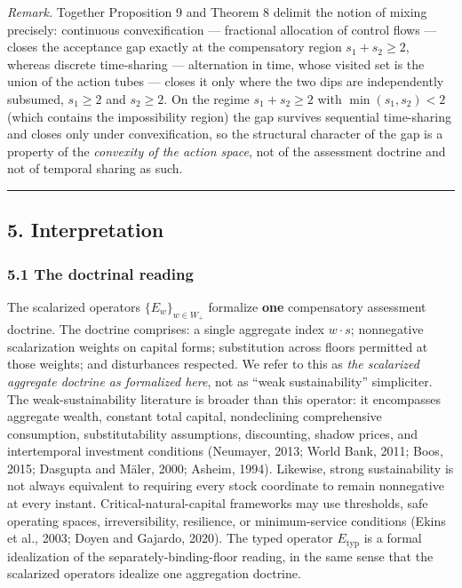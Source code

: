 \documentclass[11pt]{article}
\begin{document}
\emph{Remark.} Together Proposition 9 and Theorem 8 delimit the notion
of mixing precisely: continuous convexification --- fractional
allocation of control flows --- closes the acceptance gap exactly at the
compensatory region \(s_1 + s_2 \ge 2\), whereas discrete time-sharing
--- alternation in time, whose visited set is the union of the action
tubes --- closes it only where the two dips are independently subsumed,
\(s_1 \ge 2\) and \(s_2 \ge 2\). On the regime \(s_1 + s_2 \ge 2\) with
\(\min(s_1, s_2) < 2\) (which contains the impossibility region) the gap survives sequential time-sharing and closes only under convexification, so the structural character of the gap is a property of
the \emph{convexity of the action space}, not of the assessment doctrine
and not of temporal sharing as such.

\begin{center}\rule{0.5\linewidth}{0.5pt}\end{center}

\subsection{5. Interpretation}\label{interpretation}

\subsubsection{5.1 The doctrinal reading}\label{the-doctrinal-reading}

The scalarized operators \(\{E_w\}_{w \in W_+}\) formalize \textbf{one}
compensatory assessment doctrine. The doctrine comprises: a single
aggregate index \(w \cdot s\); nonnegative scalarization weights on
capital forms; substitution across floors permitted at those weights;
and disturbances respected. We refer to this as \emph{the scalarized
aggregate doctrine as formalized here}, not as ``weak sustainability''
simpliciter. The weak-sustainability literature is broader than this
operator: it encompasses aggregate wealth, constant total capital,
nondeclining comprehensive consumption, substitutability assumptions,
discounting, shadow prices, and intertemporal investment conditions
(Neumayer, 2013; World Bank, 2011; Boos, 2015; Dasgupta and M\"aler, 2000;
Asheim, 1994). Likewise, strong sustainability is not always equivalent
to requiring every stock coordinate to remain nonnegative at every
instant. Critical-natural-capital frameworks may use thresholds, safe
operating spaces, irreversibility, resilience, or minimum-service
conditions (Ekins et al., 2003; Doyen and Gajardo, 2020). The typed
operator \(E_{\mathrm{typ}}\) is a formal idealization of the
separately-binding-floor reading, in the same sense that the scalarized
operators idealize one aggregation doctrine.
\end{document}
